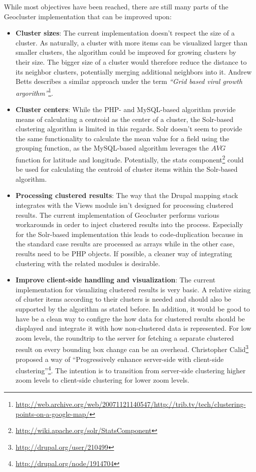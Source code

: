 While most objectives have been reached, there are still many parts of the Geocluster implementation that can be improved upon:

\begin{itemize}

\item \textbf{Cluster sizes}: The current implementation doesn't respect the size of a cluster. As naturally, a cluster with more items can be visualized larger than smaller clusters, the algorithm could be improved for growing clusters by their size. The bigger size of a cluster would therefore reduce the distance to its neighbor clusters, potentially merging additional neighbors into it. Andrew Betts describes a similar approach under the term \textit{``Grid based viral growth argorithm''}\footnote{\url{http://web.archive.org/web/20071121140547/http://trib.tv/tech/clustering-points-on-a-google-map/}}.

\item \textbf{Cluster centers}: While the PHP- and MySQL-based algorithm provide means of calculating a centroid as the center of a cluster, the Solr-based clustering algorithm is limited in this regards. Solr doesn't seem to provide the same functionality to calculate the mean value for a field using the grouping function, as the MySQL-based algorithm leverages the $AVG$ function for latitude and longitude. Potentially, the stats component\footnote{\url{http://wiki.apache.org/solr/StatsComponent}} could be used for calculating the centroid of cluster items within the Solr-based algorithm.

\item \textbf{Processing clustered results}: The way that the Drupal mapping stack integrates with the Views module isn't designed for processing clustered results. The current implementation of Geocluster performs various workarounds in order to inject clustered results into the process. Especially for the Solr-based implementation this leads to code-duplication because in the standard case results are processed as arrays while in the other case, results need to be PHP objects. If possible, a cleaner way of integrating clustering with the related modules is desirable.   

\item \textbf{Improve client-side handling and visualization}: The current implementation for visualizing clustered results is very basic. A relative sizing of cluster items according to their clusters is needed and should also be supported by the algorithm as stated before. In addition, it would be good to have be a clean way to configre the how data for clustered results should be displayed and integrate it with how non-clustered data is represented. For low zoom levels, the roundtrip to the server for fetching a separate clustered result on every bounding box change can be an overhead. Christopher Calid\footnote{\url{http://drupal.org/user/210499}} proposed a way of ``Progressively enhance server-side with client-side clustering''\footnote{\url{http://drupal.org/node/1914704}}. The intention is to transition from server-side clustering higher zoom levels to client-side clustering for lower zoom levels.

\end{itemize}

